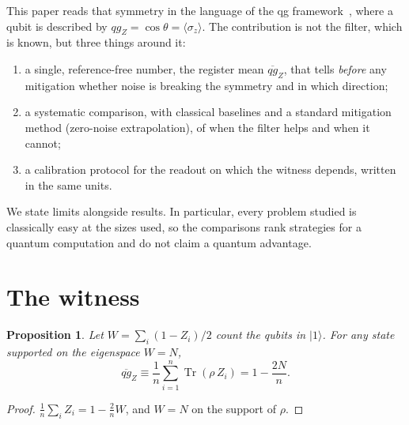 \documentclass[11pt]{article}
\newtheorem{proposition}{Proposition}
\newcommand{\qgZ}{qg_Z}
\newcommand{\mqg}{\overline{qg}_Z}
\newcommand{\Tr}{\operatorname{Tr}}
\begin{document}
This paper reads that symmetry in the language of the qg framework~\cite{monteverde2026qang}, where a
qubit is described by $\qgZ=\cos\theta=\langle\sigma_z\rangle$. The contribution is not the filter,
which is known, but three things around it:
\begin{enumerate}
\item a single, reference-free number, the register mean $\mqg$, that tells \emph{before} any
mitigation whether noise is breaking the symmetry and in which direction;
\item a systematic comparison, with classical baselines and a standard mitigation method (zero-noise
extrapolation), of when the filter helps and when it cannot;
\item a calibration protocol for the readout on which the witness depends, written in the same
units.
\end{enumerate}
We state limits alongside results. In particular, every problem studied is classically easy at the
sizes used, so the comparisons rank strategies for a quantum computation and do not claim a
quantum advantage.

\section{The witness}\label{sec:witness}

\begin{proposition}\label{prop:witness}
Let $W=\sum_i(1-Z_i)/2$ count the qubits in $|1\rangle$. For any state supported on the eigenspace
$W=N$,
\begin{equation}
\mqg\equiv\frac1n\sum_{i=1}^n\Tr(\rho\,Z_i)=1-\frac{2N}{n}.
\end{equation}
\end{proposition}
\begin{proof}
$\frac1n\sum_iZ_i=1-\frac2nW$, and $W=N$ on the support of $\rho$.
\end{proof}
\end{document}
